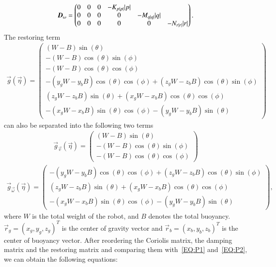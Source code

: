 \begin{align}
\emph{\textbf{D}}_{\vec{\omega}}=
\begin{pmatrix}
0&0&0&-K_{p|p|}|p|\\
0&0&0&0&-M_{q|q|}|q|\\
0&0&0&0&0&-N_{r|r|}|r|\\
\end{pmatrix}.
\end{align}
The restoring term 
\begin{align}
\vec{g}(\vec{\eta})=
\begin{pmatrix}
(W-B)\sin(\theta)\\
-(W-B)\cos(\theta)\sin(\phi)\\
-(W-B)\cos(\theta)\cos(\phi)\\
-(y_{g}W-y_{b}B)\cos(\theta)\cos(\phi)+(z_{g}W-z_{b}B)\cos(\theta)\sin(\phi)\\
(z_{g}W-z_{b}B)\sin(\theta)+(x_{g}W-x_{b}B)\cos(\theta)\cos(\phi)\\
-(x_{g}W-x_{b}B)\sin(\theta)\cos(\phi)-(y_{g}W-y_{b}B)\sin(\theta)
\end{pmatrix} \label{EQ:Restoring}
\end{align}
can also be separated into the following two terms
\begin{align}
\vec{g}_{\vec{v}}(\vec{\eta})=
\begin{pmatrix}
(W-B)\sin(\theta)\\
-(W-B)\cos(\theta)\sin(\phi)\\
-(W-B)\cos(\theta)\cos(\phi)
\end{pmatrix} \label{EQ:RestoringV}
\end{align}
\begin{align}
\vec{g}_{\vec{\omega}}(\vec{\eta})=
\begin{pmatrix}
-(y_{g}W-y_{b}B)\cos(\theta)\cos(\phi)+(z_{g}W-z_{b}B)\cos(\theta)\sin(\phi)\\
(z_{g}W-z_{b}B)\sin(\theta)+(x_{g}W-x_{b}B)\cos(\theta)\cos(\phi)\\
-(x_{g}W-x_{b}B)\sin(\theta)\cos(\phi)-(y_{g}W-y_{b}B)\sin(\theta)
\end{pmatrix},\label{EQ:RestoringW}
\end{align}
where $W$ is the total weight of the robot, and $B$ denotes the total buoyancy. $\vec{r}_{g}=(x_{g}, y_{g}, z_{g})^{T}$ is the center of gravity vector and $\vec{r}_{b}=(x_{b}, y_{b}, z_{b})^{T}$ is the center of buoyancy vector.
After reordering the Coriolis matrix, the damping matrix and the restoring matrix and comparing them with~\ref{EQ:P1} and~\ref{EQ:P2}, we can obtain the following equations:
